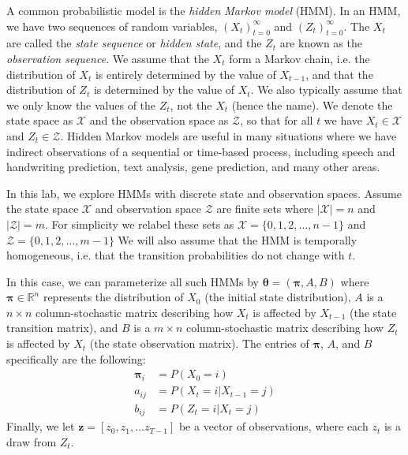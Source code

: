 \label{lab:hmm}

A common probabilistic model is the \emph{hidden Markov model} (HMM).
In an HMM, we have two sequences of random variables, $(X_t)_{t=0}^\infty$ and $(Z_t)_{t=0}^\infty$.
The $X_t$ are called the \emph{state sequence} or \emph{hidden state}, and the $Z_t$ are known as the \emph{observation sequence}.
We assume that the $X_t$ form a Markov chain, i.e. the distribution of $X_t$ is entirely determined by the value of $X_{t-1}$, and that the distribution of $Z_t$ is determined by the value of $X_t$.
We also typically assume that we only know the values of the $Z_t$, not the $X_t$ (hence the name).
We denote the state space as $\mathscr{X}$ and the observation space as $\mathscr{Z}$, so that for all $t$ we have $X_t\in \mathscr{X}$ and $Z_t\in \mathscr{Z}$.
Hidden Markov models are useful in many situations where we have indirect observations of a sequential or time-based process, including speech and handwriting prediction, text analysis, gene prediction, and many other areas.

In this lab, we explore HMMs with discrete state and observation spaces. 
Assume the state space $\mathscr{X}$ and observation space $\mathscr{Z}$ are finite sets where $\vert \mathscr{X}\vert = n$ and $\vert \mathscr{Z} \vert = m$.
For simplicity we relabel these sets as $\mathscr{X}=\{0,1,2,\ldots,n-1\}$ and $\mathscr{Z}=\{0,1,2,\ldots,m-1\}$
We will also assume that the HMM is temporally homogeneous, i.e. that the transition probabilities do not change with $t$.

In this case, we can parameterize all such HMMs by $\boldsymbol\theta = (\boldsymbol\pi, A, B)$ where $\boldsymbol\pi\in\mathbb{R}^n$ represents the distribution of $X_0$ (the initial state distribution), $A$ is a $n \times n$  
column-stochastic matrix describing how $X_t$ is affected by $X_{t-1}$ (the state transition matrix), and $B$ is a $m \times n$ column-stochastic matrix describing how $Z_t$ is affected by $X_t$ (the state observation matrix).
The entries of $\boldsymbol\pi$, $A$, and $B$ specifically are the following:
\begin{align*}
\boldsymbol\pi_i &=P(X_0=i) \\
a_{ij} &= P(X_t=i | X_{t-1}=j)
\\
b_{ij} &= P(Z_t=i | X_t=j)
\end{align*}
Finally, we let $\boldsymbol z=[z_0 ,z_1,\ldots z_{T-1}]$ be a vector of observations, where each $z_t$ is a draw from $Z_t$.

